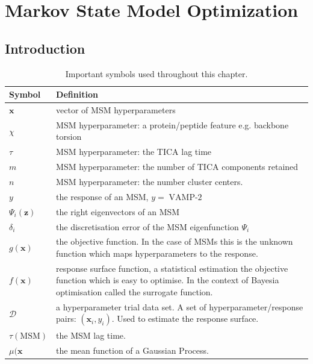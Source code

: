 \let\textcircled=\pgftextcircled
\chapter{Markov State Model Optimization}\label{chap:msm}

\section{Introduction}

\begin{table}
    \centering
    \caption[Important symbols]{Important symbols used throughout this chapter.}
    \begin{tabularx}{0.9\textwidth}{ l >{\raggedright\arraybackslash}X  } 
    \hline
        \textbf{Symbol}  &  \textbf{Definition} \\
        \hline\hline
        $\mathbf{x}$ & vector of MSM hyperparameters \\
        $\chi$ & MSM hyperparameter: a protein/peptide feature e.g. backbone torsion \\
        $\tau$ & MSM hyperparameter: the TICA lag time \\
        $m$ & MSM hyperparameter: the number of TICA components retained \\
        $n$ & MSM hyperparameter: the number cluster centers. \\
        $y$ & the response of an MSM, $y =\operatorname{VAMP-2}$ \\
        $\Psi_i(\mathbf{z})$ & the right eigenvectors of an MSM \\
        $\delta_i$ & the discretisation error of the MSM eigenfunction $\Psi_{i}$ \\
        $g(\mathbf{x})$ & the objective function. In the case of MSMs this is the unknown function 
                            which maps hyperparameters to the response. \\
        $f(\mathbf{x})$ & response surface function, a statistical estimation the objective function 
                          which is easy to optimise. In the context of Bayesia optimisation called the 
                          surrogate function. \\
        $\mathcal{D}$ & a hyperparameter trial data set. A set of hyperparameter/response pairs: $(\mathbf{x}_{i}, y_{i})$. Used to estimate the response surface. \\
        $\tau(\mathrm{MSM})$ & the MSM lag time.  \\
        $\mu(\mathbf{x}$ & the mean function of a Gaussian Process. \\

\end{tabularx}
\end{table}
